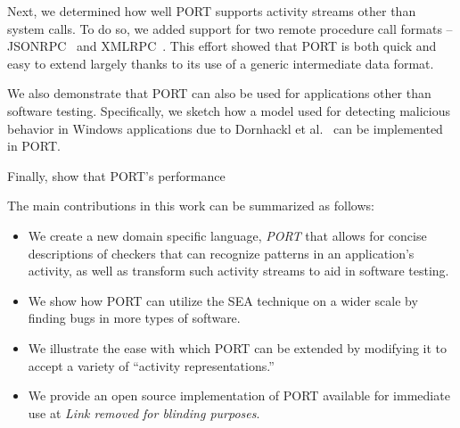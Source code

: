 Next, we
determined how well PORT
supports activity streams
other than system calls.
To do so, we 
added support for two remote procedure call formats --
JSONRPC~\cite{jsonspec} and XMLRPC~\cite{xmlspec}.
This effort
showed that PORT is both quick and easy to extend largely thanks to its
use of a generic intermediate data format.

We also demonstrate that PORT can also be used for applications other than software testing.
Specifically, we sketch how a model used for
detecting malicious behavior in Windows applications due to Dornhackl et al.~\cite{Dornhackl2014} can be implemented in PORT.

Finally, show that PORT's performance 


The main contributions in this work can be summarized as follows:

\begin{itemize}

\item We create a new domain specific language, {\em PORT}
  that allows for concise descriptions of checkers that can recognize patterns in
  an application's activity, as well as transform such activity streams to aid in software testing.

\item We show how PORT can utilize the SEA technique on a wider scale by finding bugs in more types of software.

\item We illustrate the ease with which PORT can be extended by modifying
  it to accept a variety of ``activity representations.''
  
\item We provide an open source implementation of PORT available for immediate use
at \textit{Link removed for blinding purposes}.

\end{itemize}


